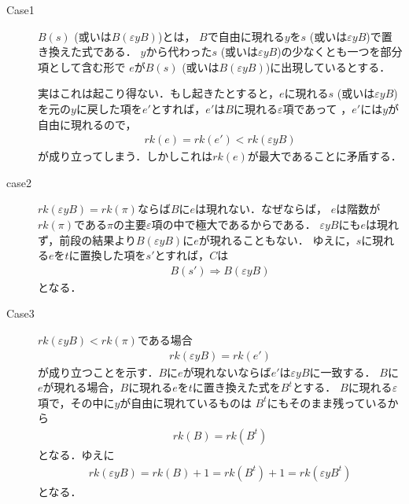 	\begin{sketch}\mbox{}
		\begin{description}
			\item[Case1]
				$B(s)$ (或いは$B(\varepsilon y B)$)とは，
				$B$で自由に現れる$y$を$s$ (或いは$\varepsilon y B$)で置き換えた式である．
				$y$から代わった$s$ (或いは$\varepsilon y B$)の少なくとも一つを部分項として含む形で
				$e$が$B(s)$ (或いは$B(\varepsilon y B)$)に出現しているとする．
				
				実はこれは起こり得ない．もし起きたとすると，$e$に現れる$s$ (或いは$\varepsilon y B$)
				を元の$y$に戻した項を$e'$とすれば，$e'$は$B$に現れる$\varepsilon$項であって
				\footnotemark，$e'$には$y$が自由に現れるので，
				\begin{align}
					rk(e) = rk(e') < rk(\varepsilon y B)
				\end{align}
				が成り立ってしまう．しかしこれは$rk(e)$が最大であることに矛盾する．
				
			\item[case2] $rk(\varepsilon y B) = rk(\pi)$ならば$B$に$e$は現れない．なぜならば，
				$e$は階数が$rk(\pi)$である$\pi$の主要$\varepsilon$項の中で極大であるからである．
				$\varepsilon y B$にも$e$は現れず，前段の結果より$B(\varepsilon y B)$に$e$が現れることもない．
				ゆえに，$s$に現れる$e$を$t$に置換した項を$s'$とすれば，$C$は
				\begin{align}
					B(s') \Longrightarrow B(\varepsilon y B)
				\end{align}
				となる．
			
			\item[Case3]
				$rk(\varepsilon y B) < rk(\pi)$である場合
				\begin{align}
					rk(\varepsilon y B) = rk(e')
				\end{align}
				が成り立つことを示す．$B$に$e$が現れないならば$e'$は$\varepsilon y B$に一致する．
				$B$に$e$が現れる場合，$B$に現れる$e$を$t$に置き換えた式を$B^{t}$とする．
				$B$に現れる$\varepsilon$項で，その中に$y$が自由に現れているものは
				$B^{t}$にもそのまま残っているから
				\begin{align}
					rk(B) = rk(B^{t})
				\end{align}
				となる．ゆえに
				\begin{align}
					rk(\varepsilon y B) = rk(B) + 1 = rk(B^{t}) + 1 = rk(\varepsilon y B^{t})
				\end{align}
				となる．
				\QED
		\end{description}
	\end{sketch}
	
